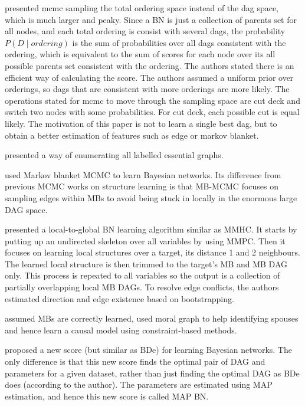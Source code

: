 \cite{friedman2000being} presented mcmc sampling the total ordering space instead of the dag space, which is much larger and peaky. Since a BN is just a collection of parents set for all nodes, and each total ordering is consist with several dags, the probability $P(D\mid ordering)$ is the sum of probabilities over all dags consistent with the ordering, which is equivalent to the sum of scores for each node over its all possible parents set consistent with the ordering. The authors stated there is an efficient way of calculating the score. The authors assumed a uniform prior over orderings, so dags that are consistent with more orderings are more likely. The operations stated for mcmc to move through the sampling space are cut deck and switch two nodes with some probabilities. For cut deck, each possible cut is equal likely. The motivation of this paper is not to learn a single best dag, but to obtain a better estimation of features such as edge or markov blanket. 

\cite{gillispie2001enumerating} presented a way of enumerating all labelled essential graphs. 

\cite{riggelsen2005mcmc} used Markov blanket MCMC to learn Bayesian networks. Its difference from previous MCMC works on structure learning is that MB-MCMC focuses on sampling edges within MBs to avoid being stuck in locally in the enormous large DAG space. 

\cite{nagele2007bayesian} presented a local-to-global BN learning algorithm similar as MMHC. It starts by putting up an undirected skeleton over all variables by using MMPC. Then it focuses on learning local structures over a target, its distance 1 and 2 neighbours. The learned local structure is then trimmed to the target's MB and MB DAG only. This process is repeated to all variables so the output is a collection of partially overlapping local MB DAGs. To resolve edge conflicts, the authors estimated direction and edge existence based on bootstrapping. 

\cite{pellet2008using} assumed MBs are correctly learned, used moral graph to help identifying spouses and hence learn a causal model using constraint-based methods.

\cite{riggelsen2008learning} proposed a new score (but similar as BDe) for learning Bayesian networks. The only difference is that this new score finds the optimal pair of DAG and parameters for a given dataset, rather than just finding the optimal DAG as BDe does (according to the author). The parameters are estimated using MAP estimation, and hence this new score is called MAP BN. 

